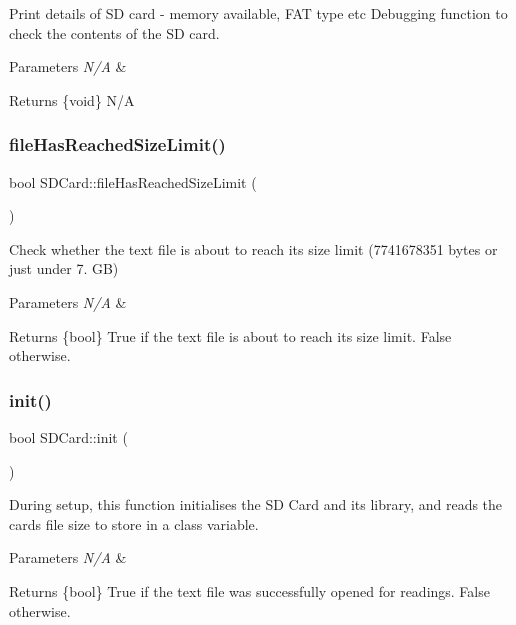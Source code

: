 Print details of SD card -\/ memory available, F\+AT type etc Debugging function to check the contents of the SD card. 
\begin{DoxyParams}{Parameters}
{\em N/A} & \\
\hline
\end{DoxyParams}
\begin{DoxyReturn}{Returns}
\{void\} N/A 
\end{DoxyReturn}
\mbox{\label{class_s_d_card_ab43bfe585365622d71e30194a404125c}} 
\subsubsection{\texorpdfstring{file\+Has\+Reached\+Size\+Limit()}{fileHasReachedSizeLimit()}}
{\footnotesize\ttfamily bool S\+D\+Card\+::file\+Has\+Reached\+Size\+Limit (\begin{DoxyParamCaption}{ }\end{DoxyParamCaption})}

Check whether the text file is about to reach its size limit (7741678351 bytes or just under 7. GB) 
\begin{DoxyParams}{Parameters}
{\em N/A} & \\
\hline
\end{DoxyParams}
\begin{DoxyReturn}{Returns}
\{bool\} True if the text file is about to reach its size limit. False otherwise. 
\end{DoxyReturn}
\mbox{\label{class_s_d_card_a7d5b2551a395d7bf883f425fb98b0b0d}} 
\subsubsection{\texorpdfstring{init()}{init()}}
{\footnotesize\ttfamily bool S\+D\+Card\+::init (\begin{DoxyParamCaption}{ }\end{DoxyParamCaption})}

During setup, this function initialises the SD Card and its library, and reads the card\textquotesingle{}s file size to store in a class variable. 
\begin{DoxyParams}{Parameters}
{\em N/A} & \\
\hline
\end{DoxyParams}
\begin{DoxyReturn}{Returns}
\{bool\} True if the text file was successfully opened for readings. False otherwise. 
\end{DoxyReturn}
\mbox{\label{class_s_d_card_a9c0edb3dd7e157501776d9760705a757}} 
